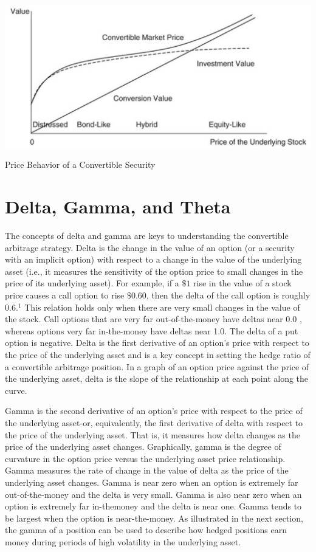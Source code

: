 \documentclass[11pt]{article}
\begin{document}
\begin{center}
\includegraphics[max width=\textwidth]{2024_04_09_d2bdb6aa136bcf7c7f5eg-03}
\end{center}

Price Behavior of a Convertible Security

\section*{Delta, Gamma, and Theta}
The concepts of delta and gamma are keys to understanding the convertible arbitrage strategy. Delta is the change in the value of an option (or a security with an implicit option) with respect to a change in the value of the underlying asset (i.e., it measures the sensitivity of the option price to small changes in the price of its underlying asset). For example, if a $\$ 1$ rise in the value of a stock price causes a call option to rise $\$ 0.60$, then the delta of the call option is roughly $0.6 .{ }^{1}$ This relation holds only when there are very small changes in the value of the stock. Call options that are very far out-of-the-money have deltas near 0.0 , whereas options very far in-the-money have deltas near 1.0. The delta of a put option is negative. Delta is the first derivative of an option's price with respect to the price of the underlying asset and is a key concept in setting the hedge ratio of a convertible arbitrage position. In a graph of an option price against the price of the underlying asset, delta is the slope of the relationship at each point along the curve.

Gamma is the second derivative of an option's price with respect to the price of the underlying asset-or, equivalently, the first derivative of delta with respect to the price of the underlying asset. That is, it measures how delta changes as the price of the underlying asset changes. Graphically, gamma is the degree of curvature in the option price versus the underlying asset price relationship. Gamma measures the rate of change in the value of delta as the price of the underlying asset changes. Gamma is near zero when an option is extremely far out-of-the-money and the delta is very small. Gamma is also near zero when an option is extremely far in-themoney and the delta is near one. Gamma tends to be largest when the option is near-the-money. As illustrated in the next section, the gamma of a position can be used to describe how hedged positions earn money during periods of high volatility in the underlying asset.
\end{document}
